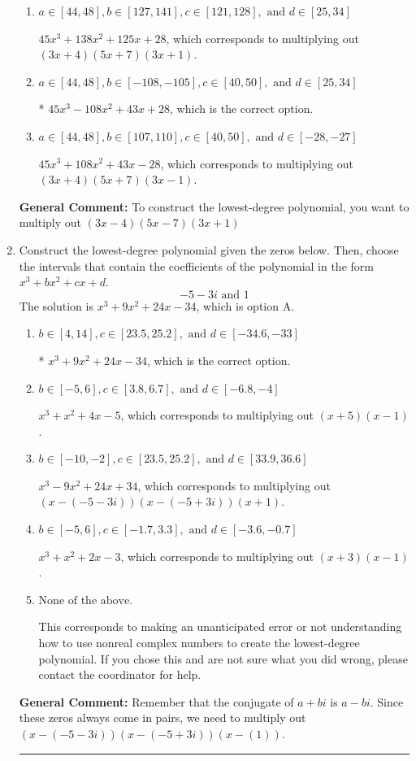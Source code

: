 \documentclass{extbook}[14pt]
\newcommand{\litem}[1]{\item #1

\rule{\textwidth}{0.4pt}}
\begin{document}
\begin{enumerate}
{\begin{enumerate}[label=\Alph*.]
$45x^{3} +12 x^{2} -85 x -28$, which corresponds to multiplying out $(3x + 4)(5x -7)(3x + 1)$.
\item \( a \in [44, 48], b \in [127, 141], c \in [121, 128], \text{ and } d \in [25, 34] \)

$45x^{3} +138 x^{2} +125 x + 28$, which corresponds to multiplying out $(3x + 4)(5x + 7)(3x + 1)$.
\item \( a \in [44, 48], b \in [-108, -105], c \in [40, 50], \text{ and } d \in [25, 34] \)

* $45x^{3} -108 x^{2} +43 x + 28$, which is the correct option.
\item \( a \in [44, 48], b \in [107, 110], c \in [40, 50], \text{ and } d \in [-28, -27] \)

$45x^{3} +108 x^{2} +43 x -28$, which corresponds to multiplying out $(3x + 4)(5x + 7)(3x -1)$.
\end{enumerate}

\textbf{General Comment:} To construct the lowest-degree polynomial, you want to multiply out $(3x -4)(5x -7)(3x + 1)$
}
\litem{
Construct the lowest-degree polynomial given the zeros below. Then, choose the intervals that contain the coefficients of the polynomial in the form $x^3+bx^2+cx+d$.
\[ -5 - 3 i \text{ and } 1 \]The solution is \( x^{3} +9 x^{2} +24 x -34 \), which is option A.\begin{enumerate}[label=\Alph*.]
\item \( b \in [4, 14], c \in [23.5, 25.2], \text{ and } d \in [-34.6, -33] \)

* $x^{3} +9 x^{2} +24 x -34$, which is the correct option.
\item \( b \in [-5, 6], c \in [3.8, 6.7], \text{ and } d \in [-6.8, -4] \)

$x^{3} + x^{2} +4 x -5$, which corresponds to multiplying out $(x + 5)(x -1)$.
\item \( b \in [-10, -2], c \in [23.5, 25.2], \text{ and } d \in [33.9, 36.6] \)

$x^{3} -9 x^{2} +24 x + 34$, which corresponds to multiplying out $(x-(-5 - 3 i))(x-(-5 + 3 i))(x + 1)$.
\item \( b \in [-5, 6], c \in [-1.7, 3.3], \text{ and } d \in [-3.6, -0.7] \)

$x^{3} + x^{2} +2 x -3$, which corresponds to multiplying out $(x + 3)(x -1)$.
\item \( \text{None of the above.} \)

This corresponds to making an unanticipated error or not understanding how to use nonreal complex numbers to create the lowest-degree polynomial. If you chose this and are not sure what you did wrong, please contact the coordinator for help.
\end{enumerate}

\textbf{General Comment:} Remember that the conjugate of $a+bi$ is $a-bi$. Since these zeros always come in pairs, we need to multiply out $(x-(-5 - 3 i))(x-(-5 + 3 i))(x-(1))$.
}
\end{enumerate}
\end{document}
